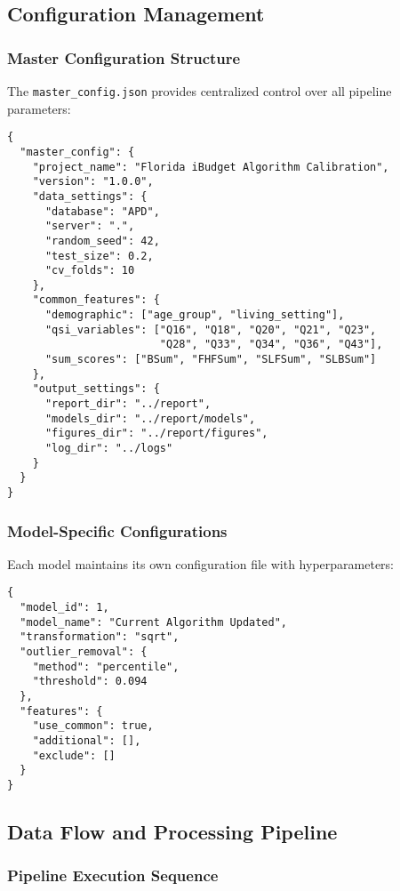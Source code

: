 \subsection{Configuration Management}

\subsubsection{Master Configuration Structure}

The \texttt{master\_config.json} provides centralized control over all pipeline parameters:

\begin{verbatim}
{
  "master_config": {
    "project_name": "Florida iBudget Algorithm Calibration",
    "version": "1.0.0",
    "data_settings": {
      "database": "APD",
      "server": ".",
      "random_seed": 42,
      "test_size": 0.2,
      "cv_folds": 10
    },
    "common_features": {
      "demographic": ["age_group", "living_setting"],
      "qsi_variables": ["Q16", "Q18", "Q20", "Q21", "Q23", 
                        "Q28", "Q33", "Q34", "Q36", "Q43"],
      "sum_scores": ["BSum", "FHFSum", "SLFSum", "SLBSum"]
    },
    "output_settings": {
      "report_dir": "../report",
      "models_dir": "../report/models",
      "figures_dir": "../report/figures",
      "log_dir": "../logs"
    }
  }
}
\end{verbatim}

\subsubsection{Model-Specific Configurations}

Each model maintains its own configuration file with hyperparameters:

\begin{verbatim}
{
  "model_id": 1,
  "model_name": "Current Algorithm Updated",
  "transformation": "sqrt",
  "outlier_removal": {
    "method": "percentile",
    "threshold": 0.094
  },
  "features": {
    "use_common": true,
    "additional": [],
    "exclude": []
  }
}
\end{verbatim}

\subsection{Data Flow and Processing Pipeline}

\subsubsection{Pipeline Execution Sequence}

